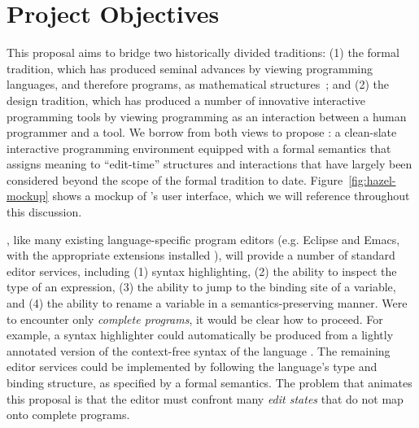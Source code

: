 \setcounter{page}{1}
\rfoot{\scriptsize\textsf{\thepage}}


\section{Project Objectives}
\label{sec:objectives}









This proposal aims to bridge two historically divided traditions: (1) the formal
tradition, which has produced seminal advances by viewing programming languages,
and therefore programs, as mathematical structures~\cite{pfpl,Pierce:2002hj}; and (2) the design
tradition, which has produced a number of innovative interactive programming
tools by viewing programming as an interaction between a human programmer and a
tool. We borrow from both views to propose \HazelEnv: a clean-slate interactive programming
environment equipped with a formal semantics that assigns meaning 
to ``edit-time'' structures and interactions that have largely been 
considered beyond the scope of the formal tradition to date. Figure~\ref{fig:hazel-mockup} shows a mockup of \HazelEnv's user interface,
which we will reference throughout this discussion.

\HazelEnv, like many existing language-specific program editors (e.g. Eclipse
and Emacs, with the appropriate  
extensions installed \cite{gamma2004contributing}), will provide a number of standard editor services, including (1)
syntax highlighting, (2)
the ability to inspect the type of an expression, (3)
the ability to jump to the binding site of a variable, and (4)
the ability to rename a variable in a semantics-preserving manner. 
Were \HazelEnv to encounter only \emph{complete programs}, it would be clear how
to proceed. For example, a syntax highlighter could automatically be produced
from a lightly annotated version of the context-free syntax of the
language \cite{DBLP:conf/tools/KrahnRV08,DBLP:conf/cc/BrandDHJJKKMOSVVV01}. The remaining editor services could be implemented
by following the language's type and binding structure, as specified by a formal
semantics. The problem that animates this proposal is that the
editor must confront many \emph{edit states} that do not map onto complete
programs.

